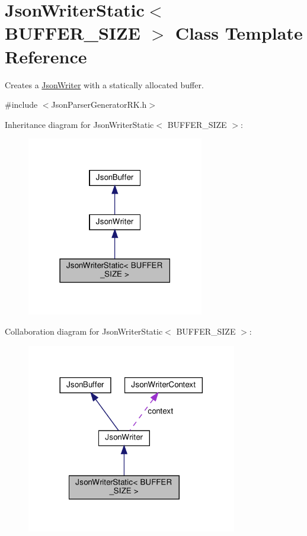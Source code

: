 \hypertarget{class_json_writer_static}{}\section{Json\+Writer\+Static$<$ B\+U\+F\+F\+E\+R\+\_\+\+S\+I\+ZE $>$ Class Template Reference}
\label{class_json_writer_static}


Creates a \hyperlink{class_json_writer}{Json\+Writer} with a statically allocated buffer.  




{\ttfamily \#include $<$Json\+Parser\+Generator\+R\+K.\+h$>$}



Inheritance diagram for Json\+Writer\+Static$<$ B\+U\+F\+F\+E\+R\+\_\+\+S\+I\+ZE $>$\+:\nopagebreak
\begin{figure}[H]
\begin{center}
\leavevmode
\includegraphics[width=219pt]{class_json_writer_static__inherit__graph}
\end{center}
\end{figure}


Collaboration diagram for Json\+Writer\+Static$<$ B\+U\+F\+F\+E\+R\+\_\+\+S\+I\+ZE $>$\+:\nopagebreak
\begin{figure}[H]
\begin{center}
\leavevmode
\includegraphics[width=260pt]{class_json_writer_static__coll__graph}
\end{center}
\end{figure}
